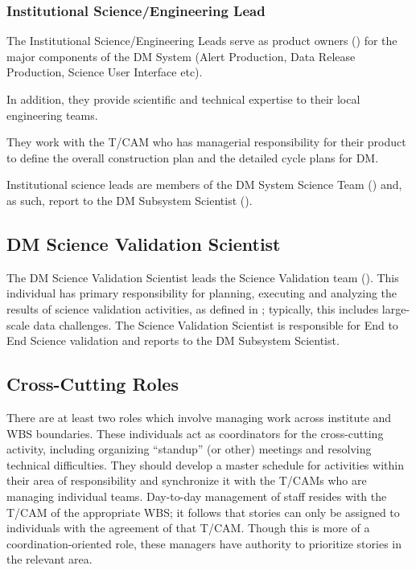 \subsubsection{Institutional Science/Engineering Lead \label{role:scilead}}

The Institutional Science/Engineering Leads serve as product owners () for the major components of the \gls{DM} System (\gls{Alert Production}, Data \gls{Release} Production, Science User Interface etc).

In addition, they provide scientific and technical expertise to their local engineering teams.

They work with the \gls{T/CAM} who has managerial responsibility for their product to define the overall construction plan and the detailed cycle plans for \gls{DM}.

Institutional science leads are members of the \gls{DM} System Science Team () and, as such, report to the \gls{DM} \gls{Subsystem Scientist} ().

\subsection{DM Science \gls{Validation} Scientist}
\label{role:dmsvs}

The \gls{DM} Science \gls{Validation} Scientist leads the Science \gls{Validation} team ().
This individual has primary responsibility for planning, executing and analyzing the results of science validation activities, as defined in ; typically, this includes large-scale data challenges.
The Science \gls{Validation} Scientist is responsible for End to End Science validation and reports to the \gls{DM} \gls{Subsystem Scientist}.

\subsection{Cross-Cutting Roles}\label{role:crosscut}

There are at least two roles which involve managing work across institute and \gls{WBS} boundaries.
These individuals act as coordinators for the cross-cutting activity, including organizing ``standup'' (or other) meetings and resolving technical difficulties.
They should develop a master schedule for activities within their area of responsibility and synchronize it with the T/CAMs who are managing individual teams.
Day-to-day management of staff resides with the \gls{T/CAM} of the appropriate \gls{WBS}; it follows that stories can only be assigned to individuals with the agreement of that \gls{T/CAM}.
Though this is more of a coordination-oriented role, these managers have authority to prioritize stories in the relevant area.

